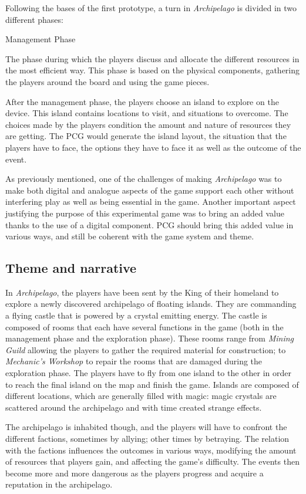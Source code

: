 Following the bases of the first prototype, a turn in \textit{Archipelago} is divided in two different phases:
\begin{labeling}{Management Phase}
\item[\textbf{Management Phase}] The phase during which the players discuss and allocate the different resources in the most efficient way. This phase is based on the physical components, gathering the players around the board and using the game pieces.
\item[\textbf{Exploration Phase}] After the management phase, the players choose an island to explore on the device. This island contains locations to visit, and situations to overcome. The choices made by the players condition the amount and nature of resources they are getting. The PCG would generate the island layout, the situation that the players have to face, the options they have to face it as well as the outcome of the event.
\end{labeling}
As previously mentioned, one of the challenges of making \textit{Archipelago} was to make both digital and analogue aspects of the game support each other without interfering play as well as being essential in the game. Another important aspect justifying the purpose of this experimental game was to bring an added value thanks to the use of a digital component. PCG should bring this added value in various ways, and still be coherent with the game system and theme.
\subsection{Theme and narrative}
In \textit{Archipelago}, the players have been sent by the King of their homeland to explore a newly discovered archipelago of floating islands. They are commanding a flying castle that is powered by a crystal emitting energy. The castle is composed of rooms that each have several functions in the game (both in the management phase and the exploration phase). These rooms range from \textit{Mining Guild} allowing the players to gather the required material for construction; to \textit{Mechanic's Workshop} to repair the rooms that are damaged during the exploration phase. The players have to fly from one island to the other in order to reach the final island on the map and finish the game. Islands are composed of different locations, which are generally filled with magic: magic crystals are scattered around the archipelago and with time created strange effects.

The archipelago is inhabited though, and the players will have to confront the different factions, sometimes by  allying; other times by betraying. The relation with the factions influences the outcomes in various ways, modifying the amount of resources that players gain, and affecting the game's difficulty. The events then become more and more dangerous as the players progress and acquire a reputation in the archipelago.

